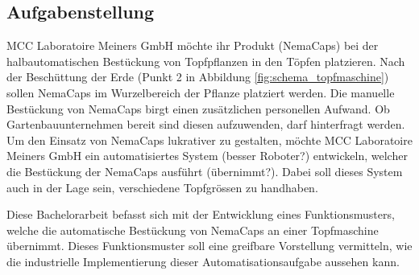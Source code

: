 \subsection{Aufgabenstellung}
MCC Laboratoire Meiners GmbH möchte ihr Produkt (NemaCaps) bei der halbautomatischen Bestückung von Topfpflanzen in den Töpfen platzieren. Nach der Beschüttung der Erde (Punkt 2 in Abbildung \ref{fig:schema_topfmaschine}) sollen NemaCaps im Wurzelbereich der Pflanze platziert werden. Die manuelle Bestückung von NemaCaps birgt einen zusätzlichen personellen Aufwand. Ob Gartenbauunternehmen bereit sind diesen aufzuwenden, darf hinterfragt werden. Um den Einsatz von NemaCaps lukrativer zu gestalten, möchte MCC Laboratoire Meiners GmbH ein automatisiertes System (besser Roboter?) entwickeln, welcher die Bestückung der NemaCaps ausführt (übernimmt?). Dabei soll dieses System auch in der Lage sein, verschiedene Topfgrössen zu handhaben.
\newline

Diese Bachelorarbeit befasst sich mit der Entwicklung eines Funktionsmusters, welche die automatische Bestückung von NemaCaps an einer Topfmaschine übernimmt. Dieses Funktionsmuster soll eine greifbare Vorstellung vermitteln, wie die industrielle Implementierung dieser Automatisationsaufgabe aussehen kann. 
\newline 


